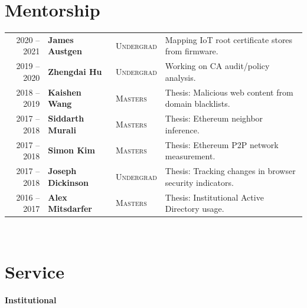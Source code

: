 \documentclass[10pt,singlecolumn]{article} %
\begin{document}
\section{Mentorship} 
\begin{tabular}{rlll}
2020 -- \textsc{2021} & \textbf{James Austgen} & \textsc{Undergrad} & Mapping IoT root certificate stores from firmware.\\ 
2019 -- 2020	         & \textbf{Zhengdai Hu} & \textsc{Undergrad} & Working on CA audit/policy analysis.\\ 
2018 -- 2019	         & \textbf{Kaishen Wang} & \textsc{Masters} & Thesis: Malicious web content from domain blacklists.\\
2017 -- 2018	         & \textbf{Siddarth Murali} & \textsc{Masters} & Thesis: Ethereum neighbor inference.\\ 
2017 -- 2018	         & \textbf{Simon Kim} & \textsc{Masters} & Thesis: Ethereum P2P network measurement.\\  
2017 -- 2018	         & \textbf{Joseph Dickinson} & \textsc{Undergrad} & Thesis: Tracking changes in browser security indicators.\\  
2016 -- 2017	         & \textbf{Alex Mitsdarfer} & \textsc{Masters} & Thesis: Institutional Active Directory usage.\\ 
\end{tabular}\\[10pt]




\newpage
\section{Service}

\textbf{Institutional}\\
\end{document}
